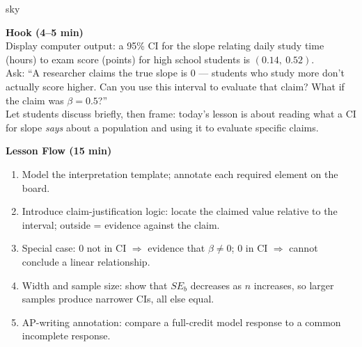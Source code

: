 \documentclass[10pt]{article}
\begin{document}
\begin{skillbox}{sky}
\begin{minipage}[t]{0.48\linewidth}
    \textbf{Hook (4--5 min)}\\
    Display computer output: a 95\% CI for the slope relating daily study time (hours) to
    exam score (points) for high school students is $(0.14,\ 0.52)$.\\[4pt]
    Ask: ``A researcher claims the true slope is 0 --- students who study more don't actually
    score higher. Can you use this interval to evaluate that claim? What if the claim was
    $\beta = 0.5$?''\\[4pt]
    Let students discuss briefly, then frame: today's lesson is about reading what a CI for
    slope \emph{says} about a population and using it to evaluate specific claims.
\end{minipage}
\hfill
\begin{minipage}[t]{0.48\linewidth}
    \textbf{Lesson Flow (15 min)}
    \begin{enumerate}
        \item Model the interpretation template; annotate each required element on the board.
        \item Introduce claim-justification logic: locate the claimed value relative to the
              interval; outside = evidence against the claim.
        \item Special case: 0 not in CI $\Rightarrow$ evidence that $\beta \ne 0$; 0 in CI
              $\Rightarrow$ cannot conclude a linear relationship.
        \item Width and sample size: show that $SE_b$ decreases as $n$ increases, so larger
              samples produce narrower CIs, all else equal.
        \item AP-writing annotation: compare a full-credit model response to a common
              incomplete response.
    \end{enumerate}
\end{minipage}
\end{skillbox}
\end{document}
